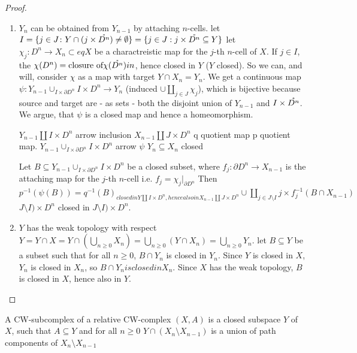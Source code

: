 \documentclass{TemplateLecture}
\begin{document}
\begin{proof}
    \begin{enumerate}
        \item \(Y_n\) can be obtained from \(Y_{n-1}\) by attaching \(n\)-cells.
        let \(I = \{j \in J\colon Y \cap (j\times\mathring{D^n}) \neq \emptyset\} = \{j \in J : j\times \mathring{D^n} \subseteq Y\}\)
        let \(\chi_j \colon D^n \to X_n \subset eq X\) be a charactreistic map for the \(j\)-th \(n\)-cell of \(X\).
        If \(j \in I\), the \(\chi(D^n) = \text{closure of} \chi(\mathring{D^n}) in\), hence closed in \(Y\) (\(Y\) closed).
        So we can, and will, consider \(\chi\) as a map with target \(Y\cap X_n = Y_n\).
        We get a continuous map \(\psi \colon Y_{n-1} \cup_{I\times \partial D^n} I\times D^n \to Y_n\) (induced \(\cup \coprod_{j \in J} \chi_j\)),
        which is bijective because source and target are - as sets - both the disjoint union of \(Y_{n-1}\) and \(I \times \mathring{D^n}\). We argue, that \(\psi\) is a closed map and hence a homeomorphism.

        \(Y_{n-1} \amalg I\times D^n\) arrow inclusion \(X_{n-1} \amalg J\times D^n\)
        q quotient map          p quotient map.
        \(Y_{n-1} \cup_{I \times \partial D^n} I\times D^n\) arrow \(\psi\) \(Y_n \subseteq X_n\) closed%

        Let \(B\subseteq Y_{n-1} \cup_{I\times \partial D^n} I\times D^n\) be a closed subset, where \(f_j \colon \partial D^n \to X_{n-1}\) is the attaching map for the \(j\)-th \(n\)-cell i.e. \(f_j = \chi_j\rvert_{\partial D^n}\) Then
        \(p^{-1}(\psi(B)) = q^{-1}(B)_{closed in Y \amalg I\times D^n, hence also in X_{n-1} \amalg J\times D^n} \cup \amalg_{j \in J\setminus I} j\times f_j^{-1}(B \cap X_{n-1})\) \(J\setminus I) \times D^n\) closed in \(J\setminus I) \times D^n\).

        \item \(Y\) has the weak topology with respect  \(Y = Y \cap X = Y \cap (\bigcup_{n \geq 0} X_n) = \bigcup_{n \geq 0} (Y \cap X_n) = \bigcup_{n \geq 0} Y_n\).
        let \(B \subseteq Y\) be a subset such that for all \(n \geq 0\), \(B\cap Y_n\) is closed in \(Y_n\). Since \(Y\) is closed in \(X\), \(Y_n\) is closed in \(X_n\), so \(B\cap Y_n is closed in X_n\). Since \(X\) has the weak topology, \(B\) is closed in \(X\), hence also in \(Y\).
    \end{enumerate}
\end{proof}

\begin{defi}{}{}
    A CW-subcomplex of a relative CW-complex \((X,A)\) is a closed subspace \(Y\) of \(X\), such that \(A \subseteq Y\) and for all \(n \geq 0\) \(Y \cap (X_n\setminus{X_{n-1}})\) is a union of path components of \(X_n\setminus X_{n-1}\)
\end{defi}
\end{document}
